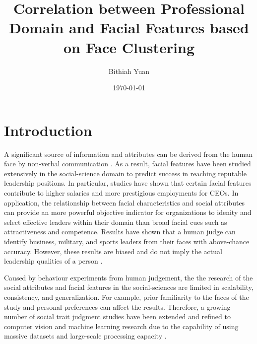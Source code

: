 \documentclass[12pt,english]{article}
\title{Correlation between Professional Domain and Facial Features based on Face Clustering}
\author{Bithiah Yuan}
\date{\today}
\begin{document}
\maketitle




\section{Introduction}
\label{sec:introduction}

\quad 
A significant source of information and attributes can be derived from the human face by non-verbal communication \cite{joo}. As a result, facial features have been studied extensively in the social-science domain to predict success in reaching reputable leadership positions. In particular, studies have shown that certain facial features contribute to higher salaries and more prestigious employments for CEOs. In application, the relationship between facial characteristics and social attributes can provide an more powerful objective indicator for organizations to idenity and select effective leaders within their domain than broad facial cues such as attractiveness and competence. Results have shown that a human judge can identify business, military, and sports leaders from their faces with above-chance accuracy. However, these results are biased and do not imply the actual leadership qualities of a person \cite{olivola}.

Caused by behaviour experiments from human judgement, the the research of the social attributes and facial features in the social-sciences are limited in scalability, consistency, and generalization. For example, prior familiarity to the faces of the study and personal preferences can affect the results. Therefore, a growing number of social trait judgment studies have been extended and refined to computer vision and machine learning research due to the capability of using massive datasets and large-scale processing capacity \cite{joo}.
\end{document}
